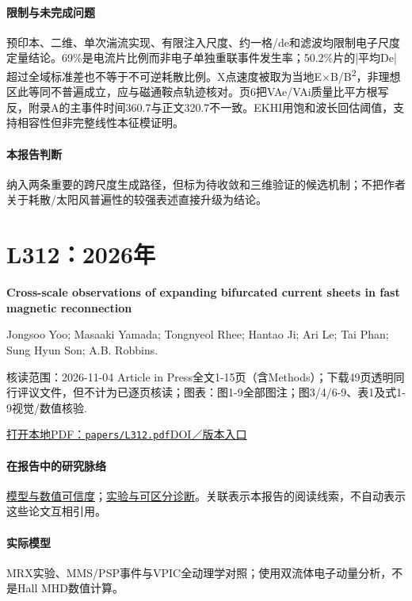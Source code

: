 \paragraph{限制与未完成问题}预印本、二维、单次湍流实现、有限注入尺度、约一格/de和滤波均限制电子尺度定量结论。69\%是电流片比例而非电子单独重联事件发生率；50.2\%片的|平均De|超过全域标准差也不等于不可逆耗散比例。X点速度被取为当地E×B/B\textsuperscript{2}，非理想区此等同不普遍成立，应与磁通鞍点轨迹核对。页6把VAe/VAi质量比平方根写反，附录A的主事件时间360.7与正文320.7不一致。EKHI用饱和波长回估阈值，支持相容性但非完整线性本征模证明。

\paragraph{本报告判断}纳入两条重要的跨尺度生成路径，但标为待收敛和三维验证的候选机制；不把作者关于耗散/太阳风普遍性的较强表述直接升级为结论。

\section{L312：2026年}\label{paper:L312}

\textbf{Cross-scale observations of expanding bifurcated current sheets in fast magnetic reconnection}\citep{L312}\

Jongsoo Yoo;  Masaaki Yamada;  Tongnyeol Rhee;  Hantao Ji;  Ari Le;  Tai Phan;  Sung Hyun Son;  A.B. Robbins.

\textsf{核读范围：}2026-11-04 Article in Press全文1-15页（含Methods）；下载49页透明同行评议文件，但不计为已逐页核读；\textsf{图表：}图1-9全部图注；图3/4/6-9、表1及式1-9视觉/数值核验.

\href{run:papers/L312.pdf}{打开本地PDF：\texttt{papers/L312.pdf}}\quad\href{https://doi.org/10.1038/s41467-026-79220-2}{DOI／版本入口}

\paragraph{在报告中的研究脉络}\hyperref[ch:numerics]{模型与数值可信度}；\hyperref[story:diagnostic]{实验与可区分诊断}。关联表示本报告的阅读线索，不自动表示这些论文互相引用。

\paragraph{实际模型}MRX实验、MMS/PSP事件与VPIC全动理学对照；使用双流体电子动量分析，不是Hall MHD数值计算。

